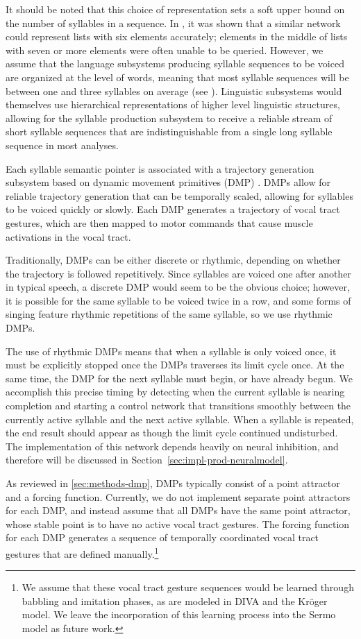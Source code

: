 It should be noted that
this choice of representation
sets a soft upper bound
on the number of syllables in a sequence.
In \cite{eliasmith2012},
it was shown that a similar network
could represent lists with six elements accurately;
elements in the middle of
lists with seven or more elements
were often unable to be queried.
However, we assume that the
language subsystems producing
syllable sequences to be voiced
are organized at the level of words,
meaning that most syllable sequences
will be between one and three syllables
on average (see \cite{pellegrino2007}).
Linguistic subsystems would themselves
use hierarchical representations
of higher level linguistic structures,
allowing for the syllable production subsystem
to receive a reliable stream of
short syllable sequences
that are indistinguishable from
a single long syllable sequence
in most analyses.

Each syllable semantic pointer
is associated with a
trajectory generation subsystem
based on dynamic movement primitives (DMP)
\cite{schaal2006,dewolf2014}.
DMPs allow for reliable trajectory generation
that can be temporally scaled,
allowing for syllables to be voiced
quickly or slowly.
Each DMP generates a trajectory
of vocal tract gestures,
which are then mapped to
motor commands that cause
muscle activations in the vocal tract.

Traditionally, DMPs can be either discrete or rhythmic,
depending on whether the trajectory
is followed repetitively.
Since syllables are voiced
one after another in typical speech,
a discrete DMP would seem to be
the obvious choice;
however, it is possible for
the same syllable to be voiced
twice in a row,
and some forms of singing
feature rhythmic repetitions
of the same syllable,
so we use rhythmic DMPs.

The use of rhythmic DMPs
means that when a syllable
is only voiced once,
it must be explicitly stopped
once the DMPs traverses
its limit cycle once.
At the same time,
the DMP for the next syllable must begin,
or have already begun.
We accomplish this precise timing
by detecting when the current syllable
is nearing completion
and starting a control network
that transitions smoothly
between the currently active syllable
and the next active syllable.
When a syllable is repeated,
the end result should appear as though
the limit cycle continued undisturbed.
The implementation of this network
depends heavily on neural inhibition,
and therefore will be discussed
in Section~\ref{sec:impl-prod-neuralmodel}.

As reviewed in \ref{sec:methods-dmp},
DMPs typically consist of a point attractor
and a forcing function.
Currently, we do not implement
separate point attractors for each DMP,
and instead assume that all DMPs
have the same point attractor,
whose stable point is
to have no active vocal tract gestures.
The forcing function for each DMP
generates a sequence of temporally coordinated
vocal tract gestures
that are defined manually.\footnote{
  We assume that these vocal tract gesture sequences
  would be learned through babbling and imitation phases,
  as are modeled in DIVA and the Kr\"{o}ger model.
  We leave the incorporation of this learning process
  into the Sermo model as future work.}

